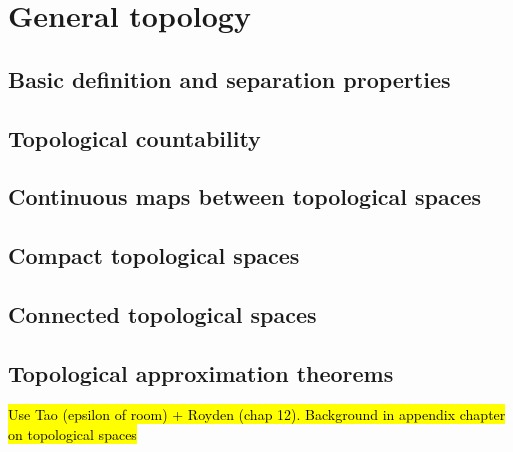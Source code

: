 
\chapter{General topology\label{chap:topology}}

\section{Basic definition and separation properties}

\section{Topological countability}

\section{Continuous maps between topological spaces}

\section{Compact topological spaces}

\section{Connected topological spaces}

\section{Topological approximation theorems}

\hl{Use Tao (epsilon of room) + Royden (chap 12). Background in appendix chapter on topological spaces}

